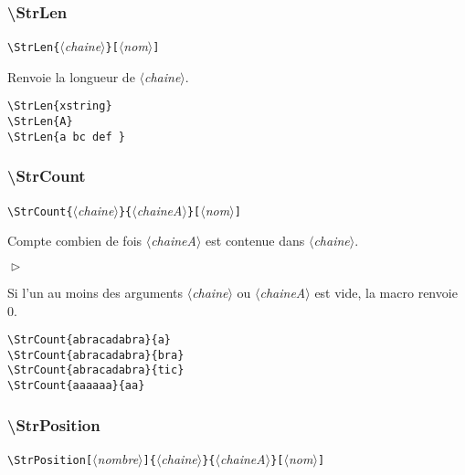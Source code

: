 \documentclass[a4paper,10pt]{article}
\newcommand\argu[1]{$\langle$\textit{#1}$\rangle$}
\newcommand\ARGU[1]{\texttt{\color{black}\{}\argu{#1}\texttt{\color{black}\}}}
\newcommand\arguC[1]{\texttt{\color{black}[}\argu{#1}\texttt{\color{black}]}}
\newenvironment{Conditions}[1][1cm]%
{\begin{list}%
	{$\vartriangleright$}%
	{\setlength{\leftmargin}{#1}
	 \setlength{\itemsep}{0pt}
	 \setlength{\parsep}{0pt}
	 \setlength{\topsep}{2ptplus3ptminus2pt}
	}}%
{\end{list}}
\newcommand\styleexemple{\small\vskip4pt}
\newcommand\verbinline{\lstinline[basicstyle=\normalsize\ttfamily]}
\begin{document}
\subsubsection{\ttfamily\textbackslash StrLen}
\verbinline|\StrLen|\ARGU{chaine}\arguC{nom}
\smallskip

Renvoie la longueur de \argu{chaine}.

\begin{minipage}[t]{0.65\linewidth}
\begin{lstlisting}
\StrLen{xstring}
\StrLen{A}
\StrLen{a bc def }
\end{lstlisting}%
\end{minipage}\hfill
\begin{minipage}[t]{0.35\linewidth}
	\styleexemple
	\par
	\par
\end{minipage}%

\subsubsection{\ttfamily\textbackslash StrCount}
\verbinline|\StrCount|\ARGU{chaine}\ARGU{chaineA}\arguC{nom}
\smallskip

Compte combien de fois \argu{chaineA} est contenue dans \argu{chaine}.\par\medskip

\begin{Conditions}
	\item Si l'un au moins des arguments \argu{chaine} ou \argu{chaineA} est vide, la macro renvoie 0.
\end{Conditions}

\begin{minipage}[t]{0.65\linewidth}
\begin{lstlisting}
\StrCount{abracadabra}{a}
\StrCount{abracadabra}{bra}
\StrCount{abracadabra}{tic}
\StrCount{aaaaaa}{aa}
\end{lstlisting}%
\end{minipage}\hfill
\begin{minipage}[t]{0.35\linewidth}
	\styleexemple
	\par
	\par
	\par
\end{minipage}%

\subsubsection{\ttfamily\textbackslash StrPosition}
\verbinline|\StrPosition|\arguC{nombre}\ARGU{chaine}\ARGU{chaineA}\arguC{nom}
\smallskip
\end{document}
